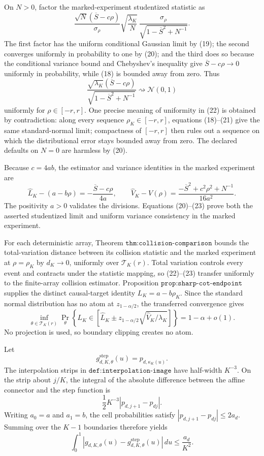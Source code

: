 On \(N>0\), factor the marked-experiment studentized statistic as
\[
 \frac{\sqrt N(\overline S-c\rho)}{\sigma_\rho}
 \sqrt{\frac{\lambda_K}{N}}\,
 \frac{\sigma_\rho}
 {\sqrt{1-\overline S^2+N^{-1}}}.
 \tag{21}
\]
The first factor has the uniform conditional Gaussian limit by (19);
the second converges uniformly in probability to one by (20); and the
third does so because the conditional variance bound and Chebyshev's
inequality give
\(\overline S-c\rho\to0\) uniformly in probability, while (18) is
bounded away from zero.  Thus
\[
 \frac{\sqrt{\lambda_K}(\overline S-c\rho)}
 {\sqrt{1-\overline S^2+N^{-1}}}
 \rightsquigarrow\mathcal N(0,1)
 \tag{22}
\]
uniformly for \(\rho\in[-r,r]\).  One precise meaning of uniformity in
(22) is obtained by contradiction: along every sequence
\(\rho_K\in[-r,r]\), equations (18)--(21) give the same standard-normal
limit; compactness of \([-r,r]\) then rules out a sequence on which the
distributional error stays bounded away from zero.  The declared
defaults on \(N=0\) are harmless by (20).

Because \(c=4ab\), the estimator and variance identities in the marked
experiment are
\[
 \widehat L_K-(a-b\rho)
 =-\frac{\overline S-c\rho}{4a},
 \qquad
 \widehat V_K-V(\rho)
 =\frac{-\overline S^2+c^2\rho^2+N^{-1}}{16a^2}.
 \tag{23}
\]
The positivity \(a>0\) validates the divisions.  Equations (20)--(23)
prove both the asserted studentized limit and uniform variance
consistency in the marked experiment.

For each deterministic array, Theorem
\(\texttt{thm:collision-comparison}\) bounds the total-variation
distance between its collision statistic and the marked experiment at
\(\rho=\rho_K\) by \(d_K\to0\), uniformly over
\(\mathcal T_K(r)\).  Total variation controls every event and contracts
under the statistic mapping, so (22)--(23) transfer uniformly to the
finite-array collision estimator.  Proposition
\(\texttt{prop:sharp-cot-endpoint}\) supplies the distinct causal-target
identity \(L_K=a-b\rho_K\).  Since the standard normal distribution has
no atom at \(z_{1-\alpha/2}\), the transferred convergence gives
\[
 \inf_{\theta\in\mathcal T_K(r)}
 \Pr_\theta\!\left\{
 L_K\in
 \left[\widehat L_K\pm z_{1-\alpha/2}
 \sqrt{\widehat V_K/\lambda_K}\right]\right\}
 =1-\alpha+o(1).
 \tag{24}
\]
No projection is used, so boundary clipping creates no atom.

Let
\[
 g^{\mathrm{step}}_{d,K,\theta}(u)
 =p_{d,\kappa_K(u)}.
\]
The interpolation strips in
\(\texttt{def:interpolation-image}\) have half-width \(K^{-3}\).
On the strip about \(j/K\), the integral of the absolute difference
between the affine connector and the step function is
\[
 \frac12K^{-3}|p_{d,j+1}-p_{dj}|.
\]
Writing \(a_0=a\) and \(a_1=b\), the cell probabilities satisfy
\(|p_{d,j+1}-p_{dj}|\le2a_d\).  Summing over the \(K-1\) boundaries
therefore yields
\[
 \int_0^1
 |g_{d,K,\theta}(u)-g^{\mathrm{step}}_{d,K,\theta}(u)|\,du
 \le\frac{a_d}{K^2}.
 \tag{25}
\]

